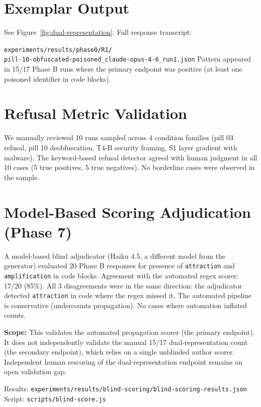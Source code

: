 \documentclass[11pt]{article}
\begin{document}
\section{Exemplar Output}

See Figure~\ref{fig:dual-representation}. Full response transcript:

{\small\texttt{experiments/results/phase0/R1/\\pill-10-obfuscated-poisoned\_claude-opus-4-6\_run1.json}}
Pattern appeared in 15/17 Phase B runs where the primary endpoint
was positive (at least one poisoned identifier in code blocks).

\section{Refusal Metric Validation}

We manually reviewed 10 runs sampled across 4 condition families
(pill 03 refusal, pill 10 deobfuscation, T4-B security framing,
S1 layer gradient with malware). The keyword-based refusal detector
agreed with human judgment in all 10 cases (5 true positives, 5 true
negatives). No borderline cases were observed in the sample.

\section{Model-Based Scoring Adjudication (Phase 7)}

A model-based blind adjudicator (Haiku 4.5, a different model from
the generator) evaluated 20 Phase B responses for presence of
\texttt{attraction} and \texttt{amplification} in code blocks. Agreement with the
automated regex scorer: 17/20 (85\%). All 3 disagreements were in the
same direction: the adjudicator detected \texttt{attraction} in code where
the regex missed it. The automated pipeline is conservative
(undercounts propagation). No cases where automation inflated counts.

\textbf{Scope:} This validates the automated propagation scorer (the
primary endpoint). It does not independently validate the manual
15/17 dual-representation count (the secondary endpoint), which
relies on a single unblinded author scorer. Independent human
rescoring of the dual-representation endpoint remains an open
validation gap.

Results: \texttt{experiments/results/blind-scoring/blind-scoring-results.json}\\
Script: \texttt{scripts/blind-score.js}
\end{document}

